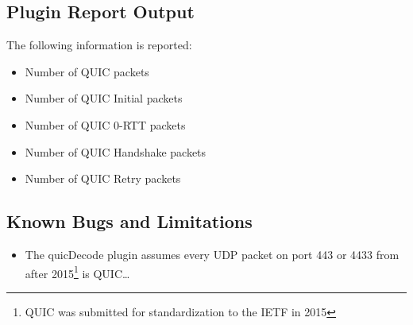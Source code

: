 \documentclass[documentation]{subfiles}
\begin{document}
\subsection{Plugin Report Output}
The following information is reported:
\begin{itemize}
    \item Number of QUIC packets
    \item Number of QUIC Initial packets
    \item Number of QUIC 0-RTT packets
    \item Number of QUIC Handshake packets
    \item Number of QUIC Retry packets
\end{itemize}

\subsection{Known Bugs and Limitations}
\begin{itemize}
    \item The quicDecode plugin assumes every UDP packet on port 443 or 4433 from after 2015\footnote{QUIC was submitted for standardization to the IETF in 2015} is QUIC\ldots
\end{itemize}
\end{document}
